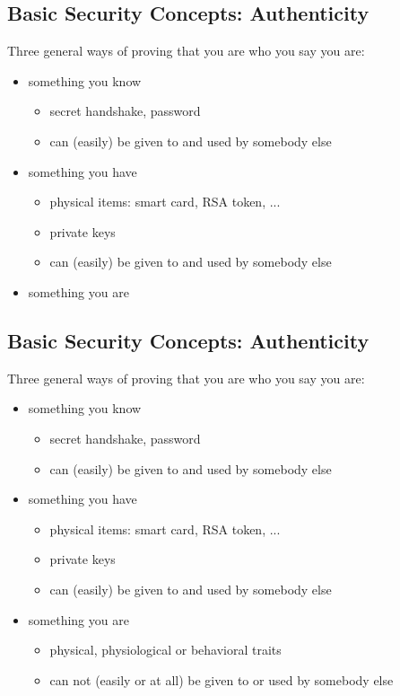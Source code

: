 \documentclass[xga]{xdvislides}
\begin{document}
\subsection{Basic Security Concepts: Authenticity}
Three general ways of proving that you are who you say you are:
\begin{itemize}
	\item something you know
		\begin{itemize}
			\item secret handshake, password
			\item can (easily) be given to and used by somebody else
		\end{itemize}
	\item something you have
		\begin{itemize}
			\item physical items: smart card, RSA token, ...
			\item private keys
			\item can (easily) be given to and used by somebody else
		\end{itemize}
	\item something you are
\end{itemize}

\subsection{Basic Security Concepts: Authenticity}
Three general ways of proving that you are who you say you are:
\begin{itemize}
	\item something you know
		\begin{itemize}
			\item secret handshake, password
			\item can (easily) be given to and used by somebody else
		\end{itemize}
	\item something you have
		\begin{itemize}
			\item physical items: smart card, RSA token, ...
			\item private keys
			\item can (easily) be given to and used by somebody else
		\end{itemize}
	\item something you are
		\begin{itemize}
			\item physical, physiological or behavioral traits
			\item can not (easily or at all) be given to or
				used by somebody else
		\end{itemize}
\end{itemize}
\end{document}
